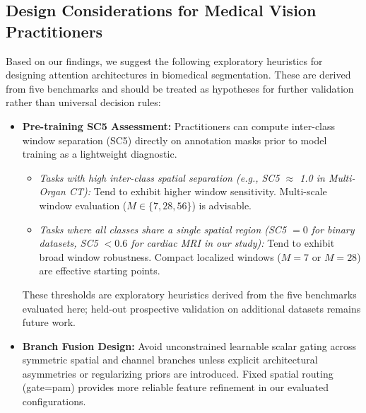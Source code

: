 \subsection{Design Considerations for Medical Vision Practitioners}
Based on our findings, we suggest the following exploratory heuristics for designing attention architectures in biomedical segmentation. These are derived from five benchmarks and should be treated as hypotheses for further validation rather than universal decision rules:
\begin{itemize}
  \item \textbf{Pre-training SC5 Assessment:} Practitioners can compute inter-class window separation (SC5) directly on annotation masks prior to model training as a lightweight diagnostic.
    \begin{itemize}
      \item \emph{Tasks with high inter-class spatial separation (e.g., SC5 $\approx$ 1.0 in Multi-Organ CT):} Tend to exhibit higher window sensitivity. Multi-scale window evaluation ($M \in \{7, 28, 56\}$) is advisable.
      \item \emph{Tasks where all classes share a single spatial region (SC5 $= 0$ for binary datasets, SC5 $< 0.6$ for cardiac MRI in our study):} Tend to exhibit broad window robustness. Compact localized windows ($M{=}7$ or $M{=}28$) are effective starting points.
    \end{itemize}
    These thresholds are exploratory heuristics derived from the five benchmarks evaluated here; held-out prospective validation on additional datasets remains future work.
  \item \textbf{Branch Fusion Design:} Avoid unconstrained learnable scalar gating across symmetric spatial and channel branches unless explicit architectural asymmetries or regularizing priors are introduced. Fixed spatial routing (gate=pam) provides more reliable feature refinement in our evaluated configurations.
\end{itemize}

